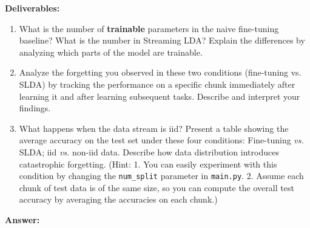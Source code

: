 \documentclass[11pt, oneside]{article}   	%
\begin{document}
\textbf{Deliverables:}
\begin{enumerate}
    \item What is the number of \textbf{trainable} parameters in the naive fine-tuning baseline? What is the number in Streaming LDA? Explain the differences by analyzing which parts of the model are trainable.
    \item Analyze the forgetting you observed in these two conditions (fine-tuning vs. SLDA) by tracking the performance on a specific chunk immediately after learning it and after learning subsequent tasks. Describe and interpret your findings.
    \item What happens when the data stream is iid? Present a table showing the average accuracy on the test set under these four conditions: Fine-tuning \textit{vs.} SLDA; iid \textit{vs.} non-iid data. Describe how data distribution introduces catastrophic forgetting. (Hint: 1. You can easily experiment with this condition by changing the \texttt{num\_split} parameter in \texttt{main.py}. 2. Assume each chunk of test data is of the same size, so you can compute the overall test accuracy by averaging the accuracies on each chunk.)
\end{enumerate}


\textbf{Answer:} \\
\end{document}
